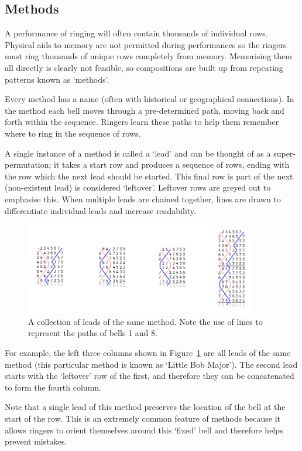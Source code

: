\documentclass[12pt]{article}
\begin{document}
\subsection{Methods}

A performance of ringing will often contain thousands of individual rows.  Physical aids to memory
are not permitted during performances so the ringers must ring thousands of unique rows completely
from memory.  Memorising them all directly is clearly not feasible, so compositions are built up
from repeating patterns known as `methods'.

Every method has a name (often with historical or geographical connections). In the method each bell
moves through a pre-determined path, moving back and forth within the sequence. Ringers learn these
paths to help them remember where to ring in the sequence of rows.

A single instance of a method is called a `lead' and can be thought of as a super-permutation; it
takes a start row and produces a sequence of rows, ending with the row which the next lead should be
started.  This final row is part of the next (non-existent lead) is considered `leftover'.  Leftover
rows are greyed out to emphasise this.  When multiple leads are chained together, lines are drawn to
differentiate individual leads and increase readability.

\begin{figure}[h!]
    \centering
    \includegraphics[width=0.9\textwidth]{lb8}
    \caption{A collection of leads of the same method.  Note the use of lines to represent the
    paths of bells 1 and 8.}\label{fig:little-bob}
\end{figure}

For example, the left three columns shown in Figure~\ref{fig:little-bob} are all leads of the same
method (this particular method is known as `Little Bob Major').  The second lead starts with the
`leftover' row of the first, and therefore they can be concatenated to form the fourth column.

Note that a single lead of this method preserves the location of the bell at the start of the
row.  This is an extremely common feature of methods because it allows ringers to orient
themselves around this `fixed' bell and therefore helps prevent mistakes.
\end{document}
